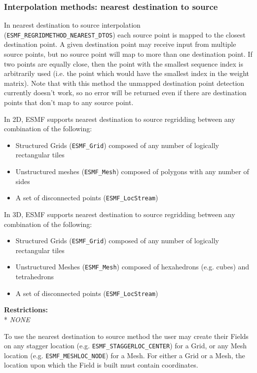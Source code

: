 \subsubsection{Interpolation methods: nearest destination to source}\label{sec:interpolation:nearestdtos}
In nearest destination to source interpolation ({\tt ESMF\_REGRIDMETHOD\_NEAREST\_DTOS}) each source point is mapped to the closest destination point. A given destination point may receive input from multiple source points, but no source point will map to more than one destination point. If two points are equally close, then the point with the smallest sequence index is arbitrarily used (i.e. the point which would have the smallest index in the weight matrix). Note that with this method the unmapped destination point detection currently doesn't work, so no error will be returned even if there are destination points that don't map to any source point. 

\smallskip

 In 2D, ESMF supports nearest destination to source regridding between any combination of the following:
 \begin{itemize}
 \item Structured Grids ({\tt ESMF\_Grid}) composed of any number of logically rectangular tiles
 \item Unstructured meshes ({\tt ESMF\_Mesh}) composed of polygons with any number of sides
 \item A set of disconnected points ({\tt ESMF\_LocStream}) 
 \end{itemize}

\smallskip

 In 3D, ESMF supports nearest destination to source regridding between any combination of the following:
 \begin{itemize}
 \item Structured Grids ({\tt ESMF\_Grid}) composed of any number of logically rectangular tiles
 \item Unstructured Meshes ({\tt ESMF\_Mesh}) composed of hexahedrons (e.g. cubes) and tetrahedrons
 \item A set of disconnected points ({\tt ESMF\_LocStream}) 
 \end{itemize}

\smallskip

\textbf{Restrictions:}\\*
\textit{NONE}

\smallskip

 To use the nearest destination to source method the user may create their Fields on any stagger location (e.g. {\tt ESMF\_STAGGERLOC\_CENTER}) for a Grid, or
 any Mesh location (e.g. {\tt ESMF\_MESHLOC\_NODE}) for a Mesh. For either a Grid or a Mesh, the location upon which the Field is built 
 must contain coordinates. 

